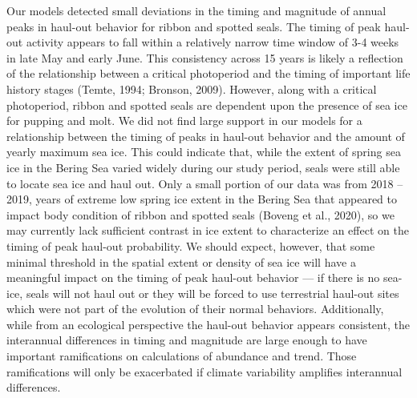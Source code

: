 \documentclass[fleqn,10pt,lineno]{wlpeerj} %
\begin{document}
Our models detected small deviations in the timing and magnitude of annual peaks
in haul-out behavior for ribbon and spotted seals. The timing of peak haul-out
activity appears to fall within a relatively narrow time window of 3-4 weeks in
late May and early June. This consistency across 15 years is likely a reflection
of the relationship between a critical photoperiod and the timing of important
life history stages (Temte, 1994; Bronson, 2009). However, along with a critical
photoperiod, ribbon and spotted seals are dependent upon the presence of sea ice
for pupping and molt. We did not find large support in our models for a
relationship between the timing of peaks in haul-out behavior and the amount of
yearly maximum sea ice. This could indicate that, while the extent of spring sea
ice in the Bering Sea varied widely during our study period, seals were still
able to locate sea ice and haul out. Only a small portion of our data was from
2018 -- 2019, years of extreme low spring ice extent in the Bering Sea that
appeared to impact body condition of ribbon and spotted seals (Boveng et al., 2020), so we may
currently lack sufficient contrast in ice extent to characterize an effect on
the timing of peak haul-out probability. We should expect, however, that some minimal threshold in
the spatial extent or density of sea ice will have a meaningful impact on the
timing of peak haul-out behavior --- if there is no sea-ice, seals will not haul
out or they will be forced to use terrestrial haul-out sites which were not part of the
evolution of their normal behaviors. Additionally, while from an
ecological perspective the haul-out behavior appears consistent, the interannual
differences in timing and magnitude are large enough to have important
ramifications on calculations of abundance and trend. Those ramifications will
only be exacerbated if climate variability amplifies interannual differences.
\end{document}
